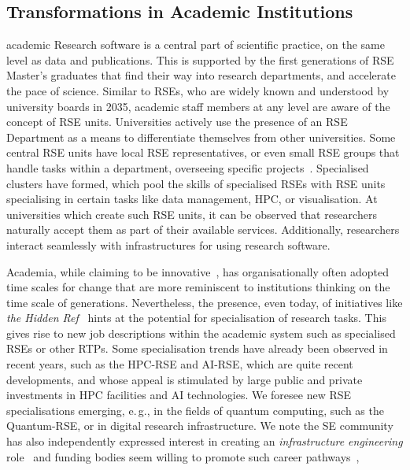 \documentclass{eceasst}
\newcommand{\eg}{e.\,g.}
\begin{document}
\subsection{Transformations in Academic Institutions}
\begin{whatis}{}{academic}
Research software is a central part of scientific practice, on the same level as data and publications.
This is supported by the first generations of RSE Master's graduates that find their way into research departments, and accelerate the pace of science.
Similar to RSEs, who are widely known and understood by university boards in 2035, academic staff members at any level are aware of the concept of RSE units.
Universities actively use the presence of an RSE Department as a means to differentiate themselves from other universities.
Some central RSE units have local RSE representatives, or even small RSE groups that handle tasks within a department, overseeing specific projects~\cite{Kempf2025-draft}.
Specialised clusters have formed, which pool the skills of specialised RSEs with RSE units specialising in certain tasks like data management, HPC, or visualisation.
At universities which create such RSE units, it can be observed that researchers naturally accept them as part of their available services.
Additionally, researchers interact seamlessly with infrastructures for using research software.
\end{whatis}
Academia, while claiming to be innovative~\cite{wzvgbayern},
has organisationally often adopted time scales for change that are more reminiscent
to institutions thinking on the time scale of generations.
Nevertheless, the presence, even today, of initiatives like \emph{the Hidden Ref}~\cite{hiddenref}
hints at the potential for specialisation of research tasks.
This gives rise to new job descriptions within the academic system such as specialised RSEs or other RTPs.
Some specialisation trends have already been observed in recent years,
such as the HPC-RSE and AI-RSE, which are quite recent developments,
and whose appeal is stimulated by large public and private investments in HPC facilities and AI technologies.
We foresee new RSE specialisations emerging, \eg, in the fields of quantum computing,
such as the Quantum-RSE, or in digital research infrastructure.
We note the SE community has also independently expressed interest in creating an \emph{infrastructure engineering} role~\cite{Sochat2024Infra}
and funding bodies seem willing to promote such career pathways~\cite{UKRI2025Infra,EuroHPC2024Federated},
\end{document}
